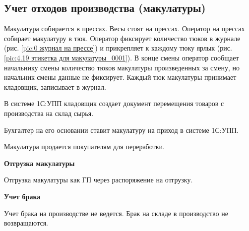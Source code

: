 \newpage
\subsection{Учет отходов производства (макулатуры)}


Макулатура собирается в прессах. Весы стоят на прессах. Оператор на прессах собирает макулатуру в тюк. Оператор фиксирует количество тюков в журнале (рис. \ref{pic:0 журнал на прессе}) и прикрепляет к каждому тюку ярлык  (рис. \ref{pic:4.19 этикетка для макулатуры_0001}). В конце смены оператор сообщает начальнику смены количество тюков макулатуры произведенных за смену, но начальник смены данные не фиксирует. Каждый тюк макулатуры принимает кладовщик, записывает в журнал.  


В системе 1С:УПП кладовщик создает документ перемещения товаров с производства на склад сырья.



Бухгалтер на его основании ставит макулатуру на приход в системе 1С:УПП. 

Макулатура продается покупателям для переработки.

\textbf{Отгрузка макулатуры}

Отгрузка макулатуры как ГП через распоряжение на отгрузку.




\textbf{Учет брака}

Учет брака на производстве не ведется.
Брак на складе в производство не возвращаются. 

\clearpage



